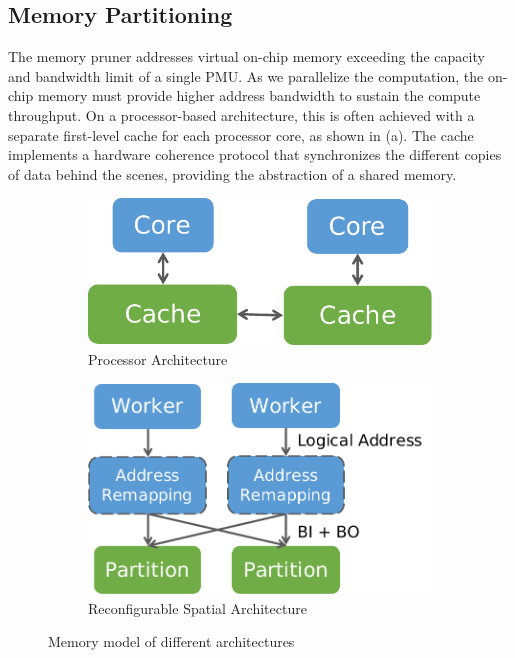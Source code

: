 \subsection{Memory Partitioning} \label{sec:memsplit}
The memory pruner addresses virtual on-chip memory exceeding the capacity and bandwidth limit of a
single PMU.
As we parallelize the computation, the on-chip memory must provide higher address bandwidth to sustain the
compute throughput.
On a processor-based architecture, this is often achieved with a separate first-level
cache for each processor core, as shown in  (a).
The cache implements a hardware coherence protocol that synchronizes the different copies of data
behind the scenes,
providing the abstraction of a shared memory.

\begin{figure}
  \begin{subfigure}[b]{0.35\textwidth}
  \centering
  \includegraphics[width=1\columnwidth]{figs/cpumemmodel.pdf}
  \caption{Processor Architecture}
  \end{subfigure}
  \hfill
  \begin{subfigure}[b]{0.45\textwidth}
  \centering
  \includegraphics[width=1\columnwidth]{figs/spatialmemmodel.pdf}
  \caption{Reconfigurable Spatial Architecture}
  \end{subfigure}
  \caption[Memory model of different architectures]{Memory model of different architectures}
  \label{fig:memmodel}
\end{figure}

